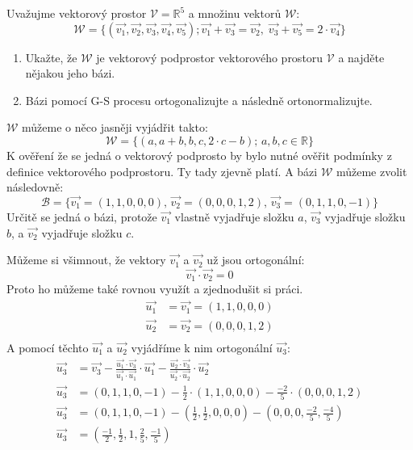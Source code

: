 \begin{example}
    Uvažujme vektorový prostor $\mathcal{V} = \mathbb{R}^5$ a
    množinu vektorů $\mathcal{W}$:
    $$\mathcal{W} = \{ (\vec{v_1}, \vec{v_2}, \vec{v_3}, \vec{v_4}, \vec{v_5});
        \vec{v_1} + \vec{v_3} = \vec{v_2},\; \vec{v_3} + \vec{v_5} = 2 \cdot
        \vec{v_4}\}$$
    \begin{enumerate}
        \item Ukažte, že $\mathcal{W}$ je vektorový podprostor vektorového prostoru
        $\mathcal{V}$ a najděte nějakou jeho bázi.
        \item Bázi pomocí G-S procesu ortogonalizujte a následně ortonormalizujte.
    \end{enumerate}

    $\mathcal{W}$ můžeme o něco jasněji vyjádřit takto:
    $$\mathcal{W} = \{(a, a + b, b, c, 2 \cdot c - b);\, a, b, c
    \in \mathbb{R}\}$$
    K ověření že se jedná o vektorový podprosto by bylo nutné ověřit podmínky z definice
    vektorového podprostoru. Ty tady zjevně platí.
    A bázi $\mathcal{W}$ můžeme zvolit následovně:
    $$\mathcal{B} = \{
        \vec{v_1} = (1, 1, 0, 0, 0),\,
        \vec{v_2} = (0, 0, 0, 1, 2),\,
        \vec{v_3} = (0, 1, 1, 0, -1)
    \}$$
    Určitě se jedná o bázi, protože $\vec{v_1}$ vlastně vyjadřuje složku
    $a$, $\vec{v_3}$ vyjadřuje složku $b$, a $\vec{v_2}$ vyjadřuje složku $c$.

    Můžeme si všimnout, že vektory $\vec{v_1}$ a $\vec{v_2}$ už jsou ortogonální:
    $$\vec{v_1} \cdot \vec{v_2} = 0$$
    Proto ho můžeme také rovnou využít a zjednodušit si práci.
    \begin{align*}
        \vec{u_1} &= \vec{v_1} = (1, 1, 0, 0, 0)\\
        \vec{u_2} &= \vec{v_2} = (0, 0, 0, 1, 2)\\
    \end{align*}
    A pomocí těchto $\vec{u_1}$ a $\vec{u_2}$ vyjádříme k nim ortogonální $\vec{u_3}$:
    \begin{align*}
        \vec{u_3} &= \vec{v_3} - \frac{\vec{u_1}\cdot \vec{v_3}}{\vec{u_1} \cdot \vec{u_1}}\cdot
        \vec{u_1} - \frac{\vec{u_2}\cdot \vec{v_3}}{\vec{u_2} \cdot \vec{u_2}}\cdot \vec{u_2}\\
        \vec{u_3} &= (0, 1, 1, 0, -1) - \frac{1}{2} \cdot (1, 1, 0, 0, 0) - \frac{-2}{5}\cdot (0, 0, 0, 1, 2)\\
        \vec{u_3} &= (0, 1, 1, 0, -1) - (\frac{1}{2}, \frac{1}{2}, 0, 0, 0) - (0, 0, 0, \frac{-2}{5}, \frac{-4}{5})\\
        \vec{u_3} &= (\frac{-1}{2}, \frac{1}{2}, 1, \frac{2}{5}, \frac{-1}{5})
    \end{align*}


\end{example}
